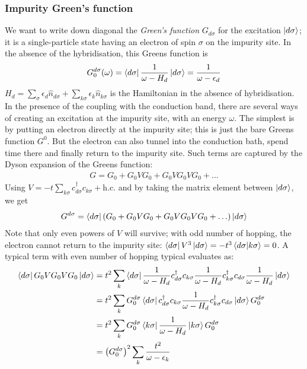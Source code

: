 \subsubsection{Impurity Green's function}
We want to write down diagonal the \textit{Green's function} \(G_{d\sigma}\) for the excitation \(\ket{d\sigma}\); it is a single-particle state having an electron of spin \(\sigma\) on the impurity site. In the absence of the hybridisation, this Greens function is
\begin{equation}\begin{aligned}
	G_0^{d\sigma}(\omega) = \bra{d\sigma}\frac{1}{\omega - H_d}\ket{d\sigma} = \frac{1}{\omega - \epsilon_d}
\end{aligned}\end{equation}
\(H_d = \sum_{\sigma}\epsilon_d \hat n_{d\sigma} + \sum_{k\sigma}\epsilon_k \hat n_{k\sigma}\) is the Hamiltonian in the absence of hybridisation. In the presence of the coupling with the conduction band, there are several ways of creating an excitation at the impurity site, with an energy \(\omega\). The simplest is by putting an electron directly at the impurity site; this is just the bare Greens function \(G^0\). But the electron can also tunnel into the conduction bath, spend time there and finally return to the impurity site. Such terms are captured by the Dyson expansion of the Greens function:
\begin{equation}\begin{aligned}
	G = G_0 + G_0 V G_0 + G_0 V G_0 V G_0 + \ldots
\end{aligned}\end{equation}
Using \(V = -t\sum_{k\sigma} c^\dagger_{d\sigma}c_{k\sigma} + \text{h.c.}\) and by taking the matrix element between \(\ket{d\sigma}\), we get
\begin{equation}\begin{aligned}
	G^{d\sigma} = \bra{d\sigma}\left(G_0 + G_0 V G_0 + G_0 V G_0 V G_0 + \ldots\right) \ket{d\sigma}
\end{aligned}\end{equation}
Note that only even powers of \(V\) will survive; with odd number of hopping, the electron cannot return to the impurity site: \( \bra{d\sigma}V^3\ket{d\sigma} = -t^3 \braket{d\sigma|k\sigma} = 0\). A typical term with even number of hopping typical evaluates as:
\begin{equation}\begin{aligned}
	\bra{d\sigma}G_0 V G_0 V G_0 \ket{d\sigma} &= t^2\sum_k \bra{d\sigma}\frac{1}{\omega - H_d} c^\dagger_{d\sigma} c_{k\sigma} \frac{1}{\omega - H_d} c^\dagger_{k\sigma} c_{d\sigma} \frac{1}{\omega - H_d} \ket{d\sigma}\\
						   &= t^2\sum_k G^{d\sigma}_0 \bra{d\sigma}c^\dagger_{d\sigma} c_{k\sigma} \frac{1}{\omega - H_d} c^\dagger_{k\sigma} c_{d\sigma} \ket{d\sigma}G^{d\sigma}_0\\
						   &= t^2\sum_k G^{d\sigma}_0 \bra{k\sigma}\frac{1}{\omega - H_d} \ket{k\sigma}G^{d\sigma}_0\\
						   &= \left(G^{d\sigma}_0\right)^2 \sum_k\frac{t^2}{\omega - \epsilon_k}\\
\end{aligned}\end{equation}
